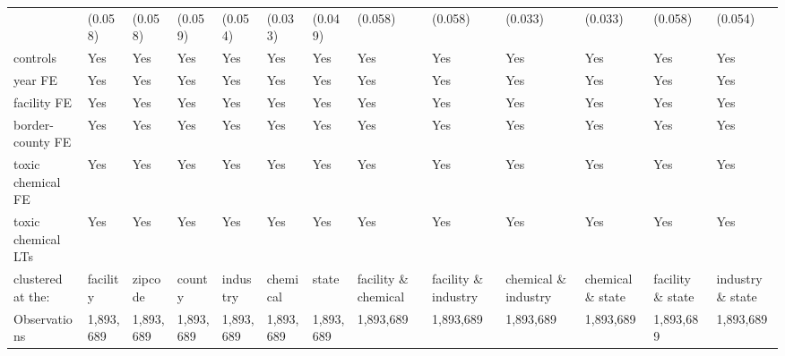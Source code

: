 \begin{table}[H]
{\begin{tabular}{@{}lllllllllllll@{}}
            & (0.058)   & (0.058)   & (0.059)   & (0.054)   & (0.033)   & (0.049)   & (0.058)              & (0.058)              & (0.033)              & (0.033)          & (0.058)          & (0.054)          \\
            controls                                      & Yes       & Yes       & Yes       & Yes       & Yes       & Yes       & Yes                  & Yes                  & Yes                  & Yes               & Yes               & Yes               \\
            year FE                                       & Yes       & Yes       & Yes       & Yes       & Yes       & Yes       & Yes                  & Yes                  & Yes                  & Yes               & Yes               & Yes               \\
            facility FE                                   & Yes       & Yes       & Yes       & Yes       & Yes       & Yes       & Yes                  & Yes                  & Yes                  & Yes               & Yes               & Yes               \\
            border-county FE                              & Yes       & Yes       & Yes       & Yes       & Yes       & Yes       & Yes                  & Yes                  & Yes                  & Yes               & Yes               & Yes               \\
            toxic chemical FE                             & Yes       & Yes       & Yes       & Yes       & Yes       & Yes       & Yes                  & Yes                  & Yes                  & Yes               & Yes               & Yes               \\
            toxic chemical LTs                            & Yes       & Yes       & Yes       & Yes       & Yes       & Yes       & Yes                  & Yes                  & Yes                  & Yes               & Yes               & Yes               \\ \midrule
            clustered at the:                             & facility  & zipcode   & county    & industry  & chemical  & state     & facility \& chemical & facility \& industry & chemical \& industry & chemical \& state & facility \& state & industry \& state \\
            Observations                                  & 1,893,689 & 1,893,689 & 1,893,689 & 1,893,689 & 1,893,689 & 1,893,689 & 1,893,689            & 1,893,689            & 1,893,689            & 1,893,689         & 1,893,689         & 1,893,689         \\

\end{tabular}}
\end{table}
